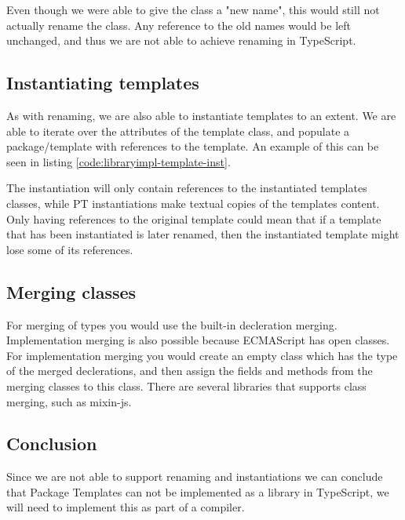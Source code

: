 
Even though we were able to give the class a "new name", this would still not actually rename the class.
Any reference to the old names would be left unchanged, and thus we are not able to achieve renaming in TypeScript.

\subsection{Instantiating templates}%
\label{sub:instantiating_templates}

As with renaming, we are also able to instantiate templates to an extent.
We are able to iterate over the attributes of the template class, and populate a package/template with references to the template.
An example of this can be seen in listing \vref{code:libraryimpl-template-inst}.


The instantiation will only contain references to the instantiated templates classes, while PT instantiations make textual copies of the templates content.
Only having references to the original template could mean that if a template that has been instantiated is later renamed, then the instantiated template might lose some of its references.


\subsection{Merging classes}%
\label{sub:merging_classes}

For merging of types you would use the built-in decleration merging\cite{declerationmerging}.
Implementation merging is also possible because ECMAScript has open classes. 
For implementation merging you would create an empty class which has the type of the merged declerations, and then assign the fields and methods from the merging classes to this class.
There are several libraries that supports class merging, such as mixin-js\cite{mixinjs}.

\subsection{Conclusion}

Since we are not able to support renaming and instantiations we can conclude that Package Templates can not be implemented as a library in TypeScript, we will need to implement this as part of a compiler.




